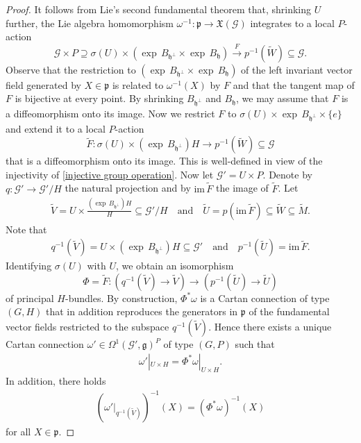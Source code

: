 \documentclass[11pt]{amsart}
\begin{document}
\begin{proof}
It follows from Lie's second fundamental theorem that, shrinking $U$ further, the Lie algebra homomorphism $\omega^{-1}:\mathfrak p\to\mathfrak X(\mathcal G)$ integrates to a local $P$-action
\[\mathcal G\times P\supseteq\sigma(U)\times(\exp\,B_{\mathfrak h^\perp}\times\exp\,B_{\mathfrak h})\xrightarrow{F} p^{-1}(\tilde W)\subseteq\mathcal G.\]
Observe that the restriction to $(\exp\,B_{\mathfrak h^\perp}\times\exp\,B_{\mathfrak h})$ of the left invariant vector field generated by $X\in\mathfrak p$ is related to $\omega^{-1}(X)$ by $F$ and that the tangent map of $F$ is bijective at every point. By shrinking $B_{\mathfrak h^\perp}$ and $B_{\mathfrak h}$, we may assume that $F$ is a diffeomorphism onto its image. Now we restrict $F$ to $\sigma(U)\times\exp\,B_{\mathfrak h^\perp}\times\{e\}$ and extend it to a local $P$-action
\[\tilde F:\sigma(U)\times(\exp\,B_{\mathfrak h^\perp})H\to
p^{-1}(\tilde W)\subseteq\mathcal G\]
that is a diffeomorphism onto its image. This is well-defined in view of the injectivity of \eqref{injective group operation}. Now let $\mathcal G'=U\times P$. Denote by $q:\mathcal G'\to \mathcal G'/H$ the natural projection and by $\mathrm{im}\,\tilde F$ the image of $\tilde F$. Let
\begin{align*}
\tilde V=U\times\frac{(\exp\,B_{\mathfrak h^\perp})H}{H}\subseteq \mathcal G'/H
\quad\text{and}\quad
\tilde U=p(\mathrm{im}\,\tilde F)\subseteq\tilde W\subseteq\tilde M.
\end{align*}
Note that
\begin{align*}
q^{-1}(\tilde V)=U\times (\exp\,B_{\mathfrak h^\perp})H\subseteq\mathcal G'
\quad\text{and}\quad
p^{-1}(\tilde U)=\mathrm{im}\,\tilde F.
\end{align*}
Identifying $\sigma(U)$ with $U$, we obtain an isomorphism
\[\Phi=\tilde F:(q^{-1}(\tilde V)\to\tilde V)\to (p^{-1}(\tilde U)\to\tilde U)\]
of principal $H$-bundles. By construction, $\Phi^*\omega$ is a Cartan connection of type $(G,H)$ that in addition reproduces the generators in $\mathfrak p$ of the fundamental vector fields restricted to the subspace $q^{-1}(\tilde V)$. Hence there exists a unique Cartan connection $\omega'\in\Omega^1(\mathcal G',\mathfrak g)^P$ of type $(G,P)$ such that
\begin{align*}  
\omega'|_{U\times H}=\Phi^*\omega|_{U\times H}.\end{align*} In addition, there holds
\begin{align}\label{P-equiv}
    (\omega'|_{q^{-1}(\tilde V)})^{-1}(X)=(\Phi^*\omega)^{-1}(X)
\end{align}
for all $X\in\mathfrak p$.


\end{proof}
\end{document}
